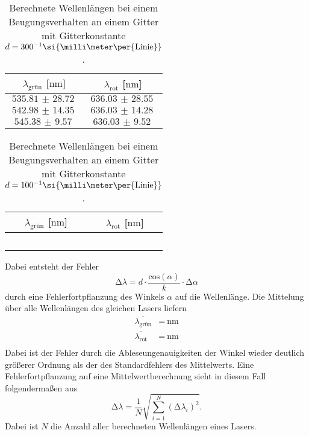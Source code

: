 \begin{table}
    \centering
    \caption{Berechnete Wellenlängen bei einem Beugungsverhalten an einem Gitter mit Gitterkonstante $\protect d = {300^{-1}}\si{\milli\meter\per{\text{Linie}}}$.}
    \label{tab:wave300}
    \begin{tabular}{c c}
        \toprule
        $\lambda_{\text{grün}}$ [$\si{\nano\meter}$] & $\lambda_{\text{rot}}$ [$\si{\nano\meter}$] \\
        \midrule
        $\SI{535.81(2872)}{}$ & $\SI{636.03(2855)}{}$ \\
        $\SI{542.98(1435)}{}$ & $\SI{636.03(1428)}{}$ \\
        $\SI{545.38(957)}{}$ & $\SI{636.03(952)}{}$  \\
        \bottomrule    
    \end{tabular}
\end{table}
\begin{table}
    \centering
    \caption{Berechnete Wellenlängen bei einem Beugungsverhalten an einem Gitter mit Gitterkonstante $\protect d = {100^{-1}}\si{\milli\meter\per{\text{Linie}}}$.}
    \label{tab:wave100}
    \begin{tabular}{c c}
        \toprule
        $\lambda_{\text{grün}}$ [$\si{\nano\meter}$] & $\lambda_{\text{rot}}$ [$\si{\nano\meter}$] \\
        \midrule
        ~ & ~ \\
        \bottomrule    
    \end{tabular}
\end{table}
Dabei entsteht der Fehler 
\begin{equation}
\increment \lambda = d \cdot \frac{\text{cos}(\alpha)}{k} \cdot \increment \alpha
\end{equation}
durch eine Fehlerfortpflanzung des Winkels $\alpha$ auf die Wellenlänge.
Die Mittelung über alle Wellenlängen des gleichen Lasers liefern
\begin{align*}
\overline{\lambda_{\text{grün}}} &= \SI{}{\nano\meter}\\
\overline{\lambda_{\text{rot}}} &= \SI{}{\nano\meter}\\
\end{align*}
Dabei ist der Fehler durch die Ableseungenauigkeiten der Winkel wieder deutlich größerer Ordnung als der des Standardfehlers des Mittelwerts. Eine Fehlerfortpflanzung auf eine Mittelwertberechnung
sieht in diesem Fall folgendermaßen aus
\begin{equation}
\increment \lambda = \frac{1}{N} \sqrt{\sum_{i=1}^{N} (\increment \lambda_{i})^2}.
\end{equation}
Dabei ist $N$ die Anzahl aller berechneten Wellenlängen eines Lasers.

